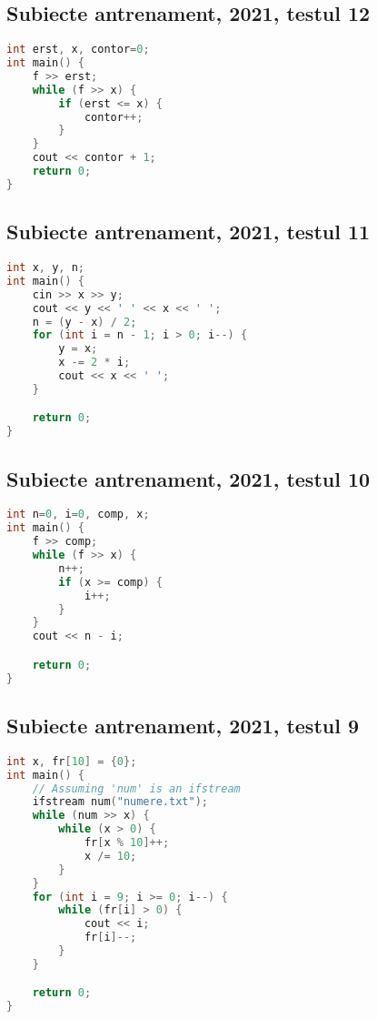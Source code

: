 \documentclass[10pt, a4paper, twocolumn]{article}
\begin{document}
\subsection*{Subiecte antrenament, 2021, testul 12}
\begin{lstlisting}[language=C++]
int erst, x, contor=0;
int main() {
    f >> erst;
    while (f >> x) {
        if (erst <= x) {
            contor++;
        }
    }
    cout << contor + 1;
    return 0;
}
\end{lstlisting}
\newpage

\subsection*{Subiecte antrenament, 2021, testul 11}
\begin{lstlisting}[language=C++]
int x, y, n;
int main() {
    cin >> x >> y;
    cout << y << ' ' << x << ' ';
    n = (y - x) / 2;
    for (int i = n - 1; i > 0; i--) {
        y = x;
        x -= 2 * i;
        cout << x << ' ';
    }

    return 0;
}
\end{lstlisting}
\vspace{0.5cm}

\subsection*{Subiecte antrenament, 2021, testul 10}
\begin{lstlisting}[language=C++]
int n=0, i=0, comp, x;
int main() {
    f >> comp;
    while (f >> x) {
        n++;
        if (x >= comp) {
            i++;
        }
    }
    cout << n - i;

    return 0;
}
\end{lstlisting}
\vspace{0.5cm}

\subsection*{Subiecte antrenament, 2021, testul 9}
\begin{lstlisting}[language=C++]
int x, fr[10] = {0};
int main() {
    // Assuming 'num' is an ifstream
    ifstream num("numere.txt");
    while (num >> x) {
        while (x > 0) {
            fr[x % 10]++;
            x /= 10;
        }
    }
    for (int i = 9; i >= 0; i--) {
        while (fr[i] > 0) {
            cout << i;
            fr[i]--;
        }
    }

    return 0;
}
\end{lstlisting}
\vspace{0.5cm}
\end{document}

